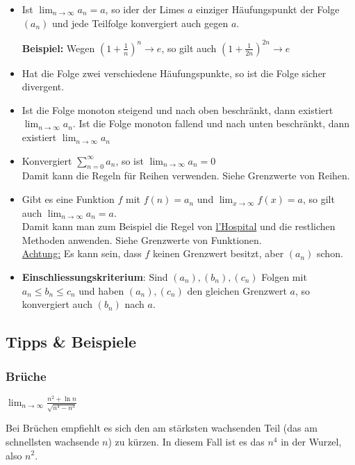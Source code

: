 \begin{itemize}[leftmargin=*]	
	\item Ist $\lim_{n \to \infty} a_n = a$, so ider der Limes $a$ einziger
	Häufungspunkt der Folge $(a_n)$ und jede Teilfolge konvergiert auch gegen $a$.
	
	\textbf{Beispiel:} Wegen $\left( 1 + \frac{1}{n} \right)^n \to e$, so gilt auch
	$\left( 1 + \frac{1}{2n} \right)^{2n} \to e$
	
	\item Hat die Folge zwei verschiedene Häufungspunkte, so ist die Folge sicher
	divergent.
	
	\item Ist die Folge monoton steigend und nach oben beschränkt, dann existiert
	$\lim_{n \to \infty} a_n$. Ist die Folge monoton fallend und nach unten
	beschränkt, dann existiert $\lim_{n \to \infty} a_n$
	
	\item Konvergiert $\sum_{n=0}^\infty a_n$, so ist $\lim_{n \to \infty} a_n =
	0$\\
	Damit kann die Regeln für Reihen verwenden. Siehe Grenzwerte von Reihen.
	
	\item Gibt es eine Funktion $f$ mit $f(n) = a_n$ und $\lim_{x \to \infty} f(x)
	= a$, so gilt auch $\lim_{n \to \infty} a_n = a$.\\
	Damit kann man zum Beispiel die Regel von \underline{l'Hospital} und die
	restlichen Methoden anwenden. Siehe Grenzwerte von Funktionen.\\
	\underline{Achtung:} Es kann sein, dass $f$ keinen Grenzwert besitzt, aber
	$(a_n)$ schon.
	
	\item \textbf{Einschliessungskriterium}: Sind $(a_n), (b_n), (c_n)$ Folgen mit
	$a_n \leq b_n \leq c_n$ und haben $(a_n), (c_n)$ den gleichen Grenzwert $a$, so
	konvergiert auch $(b_n)$ nach $a$.
\end{itemize}

\subsection{Tipps \& Beispiele}
\subsubsection{Brüche}
$\lim_{n \to \infty} \frac{n^2 + \ln n}{\sqrt{n^4 - n^3}}$

Bei Brüchen empfiehlt es sich den am stärksten wachsenden Teil (das am
schnellsten wachsende $n$) zu kürzen. In diesem Fall ist es das $n^4$ in der
Wurzel, also $n^2$.

